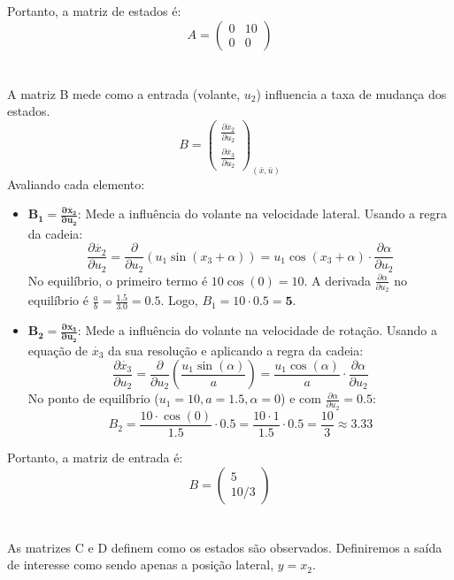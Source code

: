 \documentclass[a4paper,11pt]{article}
\begin{document}
Portanto, a matriz de estados é:
\begin{equation}
    A = \begin{pmatrix} 0 & 10 \\ 0 & 0 \end{pmatrix}
\end{equation}
\\\\
A matriz B mede como a entrada (volante, $u_2$) influencia a taxa de mudança dos estados.
$$ B = \begin{pmatrix} \frac{\partial \dot{x_2}}{\partial u_2} \\ \frac{\partial \dot{x_3}}{\partial u_2} \end{pmatrix}_{(\bar{x}, \bar{u})} $$
Avaliando cada elemento:
\begin{itemize}
    \item $\mathbf{B_1 = \frac{\partial \dot{x_2}}{\partial u_2}}$: Mede a influência do volante na velocidade lateral. Usando a regra da cadeia:
    $$ \frac{\partial \dot{x_2}}{\partial u_2} = \frac{\partial}{\partial u_2} \left( u_1 \sin(x_3 + \alpha) \right) = u_1 \cos(x_3 + \alpha) \cdot \frac{\partial \alpha}{\partial u_2} $$
    No equilíbrio, o primeiro termo é $10 \cos(0)=10$. A derivada $\frac{\partial \alpha}{\partial u_2}$ no equilíbrio é $\frac{a}{b} = \frac{1.5}{3.0} = 0.5$.
    Logo, $B_1 = 10 \cdot 0.5 = \mathbf{5}$.
    
    \item $\mathbf{B_2 = \frac{\partial \dot{x_3}}{\partial u_2}}$: Mede a influência do volante na velocidade de rotação. Usando a equação de $\dot{x_3}$ da sua resolução e aplicando a regra da cadeia:
    $$ \frac{\partial \dot{x_3}}{\partial u_2} = \frac{\partial}{\partial u_2} \left( \frac{u_1 \sin(\alpha)}{a} \right) = \frac{u_1 \cos(\alpha)}{a} \cdot \frac{\partial \alpha}{\partial u_2} $$
    No ponto de equilíbrio ($u_1=10, a=1.5, \alpha=0$) e com $\frac{\partial \alpha}{\partial u_2} = 0.5$:
    $$ B_2 = \frac{10 \cdot \cos(0)}{1.5} \cdot 0.5 = \frac{10 \cdot 1}{1.5} \cdot 0.5 = \frac{10}{3} \approx \mathbf{3.33} $$
\end{itemize}
Portanto, a matriz de entrada é:
\begin{equation}
    B = \begin{pmatrix} 5 \\ 10/3 \end{pmatrix}
\end{equation}
\\\\
As matrizes C e D definem como os estados são observados. Definiremos a saída de interesse como sendo apenas a posição lateral, $y = x_2$.
\end{document}
